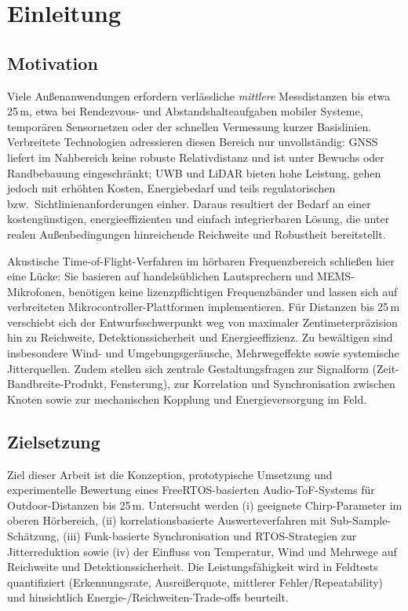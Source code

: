 \section{Einleitung}

\subsection{Motivation}

Viele Außenanwendungen erfordern verlässliche \emph{mittlere} Messdistanzen bis etwa 25\,m, etwa bei Rendezvous- und Abstandshalteaufgaben mobiler Systeme, temporären Sensornetzen oder der schnellen Vermessung kurzer Basislinien. Verbreitete Technologien adressieren diesen Bereich nur unvollständig: GNSS liefert im Nahbereich keine robuste Relativdistanz und ist unter Bewuchs oder Randbebauung eingeschränkt; UWB und LiDAR bieten hohe Leistung, gehen jedoch mit erhöhten Kosten, Energiebedarf und teils regulatorischen bzw.\ Sichtlinienanforderungen einher. Daraus resultiert der Bedarf an einer kostengünstigen, energieeffizienten und einfach integrierbaren Lösung, die unter realen Außenbedingungen hinreichende Reichweite und Robustheit bereitstellt.

Akustische Time-of-Flight-Verfahren im hörbaren Frequenzbereich schließen hier eine Lücke: Sie basieren auf handelsüblichen Lautsprechern und MEMS-Mikrofonen, benötigen keine lizenzpflichtigen Frequenzbänder und lassen sich auf verbreiteten Mikrocontroller-Plattformen implementieren. Für Distanzen bis 25\,m verschiebt sich der Entwurfsschwerpunkt weg von maximaler Zentimeterpräzision hin zu Reichweite, Detektionssicherheit und Energieeffizienz. Zu bewältigen sind insbesondere Wind- und Umgebungsgeräusche, Mehrwegeffekte sowie systemische Jitterquellen. Zudem stellen sich zentrale Gestaltungsfragen zur Signalform (Zeit-Bandbreite-Produkt, Fensterung), zur Korrelation und Synchronisation zwischen Knoten sowie zur mechanischen Kopplung und Energieversorgung im Feld.

\subsection{Zielsetzung}

Ziel dieser Arbeit ist die Konzeption, prototypische Umsetzung und experimentelle Bewertung eines FreeRTOS-basierten Audio-ToF-Systems für Outdoor-Distanzen bis 25\,m. Untersucht werden (i) geeignete Chirp-Parameter im oberen Hörbereich, (ii) korrelationsbasierte Auswerteverfahren mit Sub-Sample-Schätzung, (iii) Funk-basierte Synchronisation und RTOS-Strategien zur Jitterreduktion sowie (iv) der Einfluss von Temperatur, Wind und Mehrwege auf Reichweite und Detektionssicherheit. Die Leistungsfähigkeit wird in Feldtests quantifiziert (Erkennungsrate, Ausreißerquote, mittlerer Fehler/Repeatability) und hinsichtlich Energie-/Reichweiten-Trade-offs beurteilt.


